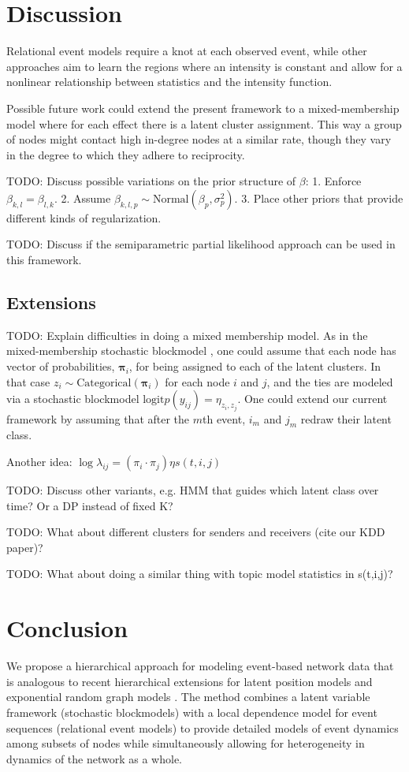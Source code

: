 \documentclass[11pt]{article}
\begin{document}
\section{Discussion}
Relational event models \cite{Butts2008} require a knot at each observed event, while other approaches \cite{Gunawardana2011} aim to learn the regions where an intensity is constant and allow for a nonlinear relationship between statistics and the intensity function.  

Possible future work could extend the present framework to a mixed-membership model where for each effect there is a latent cluster assignment.  This way a group of nodes might contact high in-degree nodes at a similar rate, though they vary in the degree to which they adhere to reciprocity.


TODO: Discuss possible variations on the prior structure of $\beta$: 1. Enforce $\beta_{k,l} = \beta_{l,k}$. 2. Assume $\beta_{k,l,p} \sim \mbox{Normal}(\beta_p,\sigma_p^2)$. 3. Place other priors that provide different kinds of regularization. 

TODO: Discuss if the semiparametric partial likelihood approach can be used in this framework.

\subsection{Extensions}
TODO: Explain difficulties in doing a mixed membership model.  As in the mixed-membership stochastic blockmodel \cite{Airoldi2008,Shafiei2010}, one could assume that each node has vector of probabilities, $\boldsymbol{\pi}_i$, for being assigned to each of the latent clusters.  In that case $z_i \sim \mbox{Categorical}(\boldsymbol{\pi}_i)$ for each node $i$ and $j$, and the ties are modeled via a stochastic blockmodel $\mbox{logit} p(y_{ij}) = \eta_{z_i,z_j}$.  One could extend our current framework by assuming that after the $m$th event, $i_m$ and $j_m$ redraw their latent class.  

Another idea: $\log \lambda_{ij} = (\pi_i \cdot \pi_j) \eta s(t,i,j)$

TODO: Discuss other variants, e.g. HMM that guides which latent class over time?  Or a DP instead of fixed K?

TODO: What about different clusters for senders and receivers (cite our KDD paper)?

TODO: What about doing a similar thing with topic model statistics in s(t,i,j)?

\section{Conclusion}
 We propose a hierarchical approach for modeling event-based network data that is analogous to recent hierarchical extensions for latent position models \cite{Handcock2007} and exponential random graph models \cite{Schweinberger2011}.  The method combines a latent variable framework (stochastic blockmodels) with a local dependence model for event sequences (relational event models) to provide detailed models of event dynamics among subsets of nodes while simultaneously allowing for heterogeneity in dynamics of the network as a whole.
\end{document}
